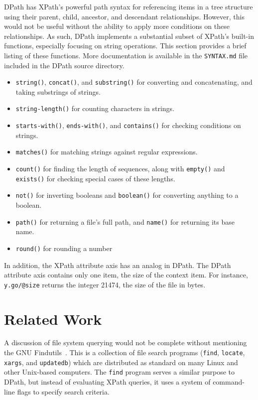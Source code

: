 \documentclass{scrartcl}
\begin{document}
DPath has XPath's powerful path syntax for referencing items in a tree structure
using their parent, child, ancestor, and descendant relationships. However, this
would not be useful without the ability to apply more conditions on these
relationships. As such, DPath implements a substantial subset of XPath's
built-in functions, especially focusing on string operations. This section
provides a brief listing of these functions. More documentation is available in
the \texttt{SYNTAX.md} file included in the DPath source directory.

\begin{itemize}
\item \texttt{string()}, \texttt{concat()}, and \texttt{substring()} for
  converting and concatenating, and taking substrings of strings.
\item \texttt{string-length()} for counting characters in strings.
\item \texttt{starts-with()}, \texttt{ends-with()}, and \texttt{contains()} for
  checking conditions on strings.
\item \texttt{matches()} for matching strings against regular expressions.
\item \texttt{count()} for finding the length of sequences, along with
  \texttt{empty()} and \texttt{exists()} for checking special cases of these
  lengths.
\item \texttt{not()} for inverting booleans and \texttt{boolean()} for
  converting anything to a boolean.
\item \texttt{path()} for returning a file's full path, and \texttt{name()} for
  returning its base name.
\item \texttt{round()} for rounding a number
\end{itemize}

In addition, the XPath attribute axis has an analog in DPath. The DPath
attribute axis contains only one item, the size of the context item. For
instance, \texttt{y.go/@size} returns the integer 21474, the size of the file in
bytes.

\section{Related Work}
\label{sec:related}

A discussion of file system querying would not be complete without mentioning
the GNU Findutils~\cite{find}. This is a collection of file search programs
(\texttt{find}, \texttt{locate}, \texttt{xargs}, and \texttt{updatedb}) which
are distributed as standard on many Linux and other Unix-based computers. The
\texttt{find} program serves a similar purpose to DPath, but instead of
evaluating XPath queries, it uses a system of command-line flags to specify
search criteria.
\end{document}
